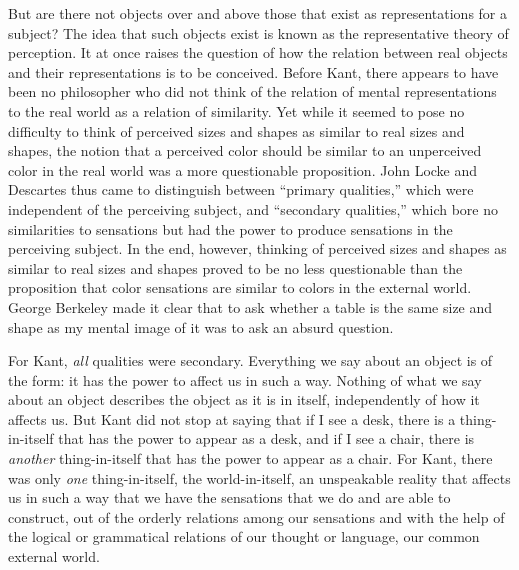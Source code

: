 \documentclass[smallextended]{svjour3}
\begin{document}
But are there not objects over and above those that exist as representations for a subject?  The idea that such objects exist is known as the {representative theory of perception}. It at once raises the question of how the relation between real objects and their representations is to be conceived. Before Kant, there appears to have been no philosopher who did not think of the relation of mental representations to the real world as a relation of similarity. Yet while it seemed to pose no difficulty to think of perceived sizes and shapes as similar to real sizes and shapes, the notion that a perceived color should be similar to an unperceived color in the real world was a more questionable proposition. John Locke and Descartes thus came to distinguish between ``primary qualities,'' which were independent of the perceiving subject, and ``secondary qualities,'' which bore no similarities to sensations but had the power to produce sensations in the perceiving subject. In the end, however, thinking of perceived sizes and shapes as similar to real sizes and shapes proved to be no less questionable than the proposition that color sensations are similar to colors in the external world. George Berkeley made it clear that to ask whether a table is the same size and shape as my mental image of it was to ask an absurd question.

For Kant, \emph{all} qualities were secondary. Everything we say about an object is of the form: it has the power to affect us in such a way. Nothing of what we say about an object describes the object as it is in itself, independently of how it affects us. But Kant did not stop at saying that if I see a desk, there is a thing-in-itself that has the power to appear as a desk, and if I see a chair, there is \emph{another} thing-in-itself that has the power to appear as a chair. For Kant, there was only \emph{one} {thing-in-itself}, the {world-in-itself}, an unspeakable reality that affects us in such a way that we have the sensations that we do and are able to construct, out of the orderly relations among our sensations and with the help of the logical or grammatical relations of our thought or language, our common external world.
\end{document}
